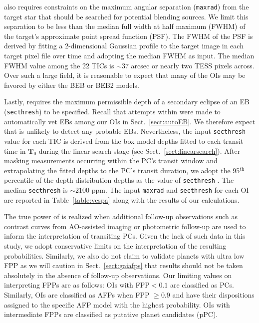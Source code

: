 \vespa{} also requires constraints on the maximum angular separation
(\texttt{maxrad}) from the target star that
should be searched for potential blending sources. We limit this separation to be less than the median
full width at half maximum (FWHM) of the target's approximate point spread function (PSF).
The FWHM of the PSF is derived by fitting a 2-dimensional Gaussian profile to the
target image in each target pixel file over time and adopting the median FWHM as \vespa{} input.
The median FWHM value among the 22 TICs is $\sim 37$ arcsec or nearly two TESS pixels across.
Over such a large field, it is reasonable to expect that many of the OIs may be favored by either the
BEB or BEB2 models.

Lastly, \vespa{} requires
the maximum permissible depth of a secondary eclipse of an EB (\texttt{secthresh}) to be specified.
Recall that attempts within \pipeline{} were made to automatically vet EBs among our OIs in
Sect.~\ref{sect:autoEB}.
We therefore expect that \vespa{} is unlikely to detect any probable EBs. Nevertheless, the input
\texttt{secthresh} value for each TIC is derived from
the box model depths fitted to each transit time in $\mathbf{T}_0$ during the linear search stage
(see Sect.~\ref{sect:linearsearch}). After masking measurements occurring within the PC's
transit window and extrapolating the fitted depths to the PC's transit duration,
we adopt the 95$^{\text{th}}$ percentile of the depth distribution depths as the value of \texttt{secthresh}
\citep{crossfield18}. The median \texttt{secthresh} is $\sim 2100$ ppm. The input \texttt{maxrad} and
\texttt{secthresh} for each OI are reported in Table~\ref{table:vespa} along with the results of
our \vespa{} calculations.



The true power of \vespa{} is realized when additional follow-up observations such as 
contrast curves from AO-assisted imaging or photometric follow-up
are used to inform the interpretation of transiting PCs.
Given the lack of such data in this study, we adopt conservative limits on the interpretation of the
resulting \vespa{} probabilities. Similarly, we also do not claim to validate planets with ultra low FPP
\citep[$<0.01$; e.g.][]{montet15,crossfield18,livingston18} as we will caution in Sect.~\ref{sect:gaiafps}
that \vespa{} results should not be taken absolutely in the absence of follow-up
observations. Our limiting values on interpreting FPPs are as follows: OIs with FPP$<0.1$
are classified as PCs. Similarly, OIs are classified as AFPs when
FPP $\geq 0.9$ and have their dispositions assigned to the specific AFP model with the highest
probability. OIs with intermediate FPPs are classified as putative planet candidates (pPC).

